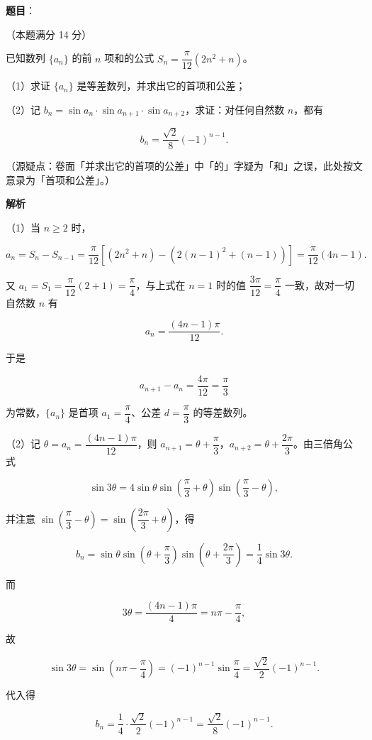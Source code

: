\begin{answer}

\textbf{题目}：

（本题满分 14 分）

已知数列 $\{a_n\}$ 的前 $n$ 项和的公式 $S_n=\dfrac{\pi}{12}(2n^2+n)$。

（1）求证 $\{a_n\}$ 是等差数列，并求出它的首项和公差；

（2）记 $b_n=\sin a_n\cdot\sin a_{n+1}\cdot\sin a_{n+2}$，求证：对任何自然数 $n$，都有

\nopagebreak[4]
\[
b_n=\frac{\sqrt2}{8}(-1)^{n-1}.
\]

（源疑点：卷面「并求出它的首项的公差」中「的」字疑为「和」之误，此处按文意录为「首项和公差」。）

\textbf{解析}

（1）当 $n\ge 2$ 时，

\nopagebreak[4]
\[
a_n=S_n-S_{n-1}
=\frac{\pi}{12}\left[(2n^2+n)-\left(2(n-1)^2+(n-1)\right)\right]
=\frac{\pi}{12}(4n-1).
\]

又 $a_1=S_1=\dfrac{\pi}{12}(2+1)=\dfrac{\pi}{4}$，与上式在 $n=1$ 时的值 $\dfrac{3\pi}{12}=\dfrac{\pi}{4}$ 一致，故对一切自然数 $n$ 有

\nopagebreak[4]
\[
a_n=\frac{(4n-1)\pi}{12}.
\]

于是

\nopagebreak[4]
\[
a_{n+1}-a_n=\frac{4\pi}{12}=\frac{\pi}{3}
\]

为常数，$\{a_n\}$ 是首项 $a_1=\dfrac{\pi}{4}$、公差 $d=\dfrac{\pi}{3}$ 的等差数列。

（2）记 $\theta=a_n=\dfrac{(4n-1)\pi}{12}$，则 $a_{n+1}=\theta+\dfrac{\pi}{3}$，$a_{n+2}=\theta+\dfrac{2\pi}{3}$。由三倍角公式

\nopagebreak[4]
\[
\sin 3\theta=4\sin\theta\sin\left(\frac{\pi}{3}+\theta\right)\sin\left(\frac{\pi}{3}-\theta\right),
\]

并注意 $\sin\left(\dfrac{\pi}{3}-\theta\right)=\sin\left(\dfrac{2\pi}{3}+\theta\right)$，得

\nopagebreak[4]
\[
b_n=\sin\theta\sin\left(\theta+\frac{\pi}{3}\right)\sin\left(\theta+\frac{2\pi}{3}\right)=\frac14\sin 3\theta.
\]

而

\nopagebreak[4]
\[
3\theta=\frac{(4n-1)\pi}{4}=n\pi-\frac{\pi}{4},
\]

故

\nopagebreak[4]
\[
\sin 3\theta=\sin\left(n\pi-\frac{\pi}{4}\right)=(-1)^{n-1}\sin\frac{\pi}{4}=\frac{\sqrt2}{2}(-1)^{n-1}.
\]

代入得

\nopagebreak[4]
\[
b_n=\frac14\cdot\frac{\sqrt2}{2}(-1)^{n-1}=\frac{\sqrt2}{8}(-1)^{n-1}.
\]


\end{answer}